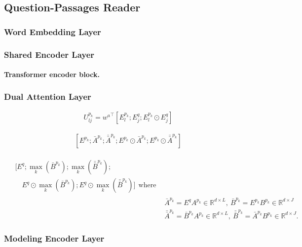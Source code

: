 \documentclass[11pt,a4paper]{article}
\theoremstyle{mydef}
\theoremstyle{myprob}
\begin{document}
\subsection{Question-Passages Reader}

\subsubsection{Word Embedding Layer}

\subsubsection{Shared Encoder Layer}

\paragraph{Transformer encoder block.}

\subsubsection{Dual Attention Layer}

\begin{align}
U^{p_k}_{lj} = {w^a}^\top [ E^{p_k}_l; E^q_j; E^{p_k}_l \odot E^q_j ]
\end{align}

\begin{align}
\nonumber
[E^{p_k}; \bar{A}^{p_k}; \bar{\bar{A}}^{p_k}; E^{p_k} \odot \bar{A}^{p_k}; E^{p_k} \odot \bar{\bar{A}}^{p_k}] 
\end{align}

\begin{align}
\begin{split}
\nonumber
& [ E^{q} ; \max_k(\bar{B}^{p_k}); \max_k(\bar{\bar{B}}^{p_k}); \\
&\hspace{1em} E^{q} \odot \max_k(\bar{B}^{p_k}); E^{q} \odot \max_k(\bar{\bar{B}}^{p_k})  ] \mathrm{\ \ where}
\end{split}\\
\nonumber
&\bar{A}^{p_k} =  E^q A^{p_k}\in \mathbb{R}^{d \times L}, \ 
\bar{B}^{p_k} =  E^{p_k} B^{p_k} \in \mathbb{R}^{d \times J} \\
\nonumber
&\bar{\bar{A}}^{p_k} = \bar{B}^{p_k} A^{p_k} \in \mathbb{R}^{d \times L}, \ 
\bar{\bar{B}}^{p_k} = \bar{A}^{p_k} B^{p_k} \in \mathbb{R}^{d \times J}.
\end{align}

\subsubsection{Modeling Encoder Layer}
\end{document}
